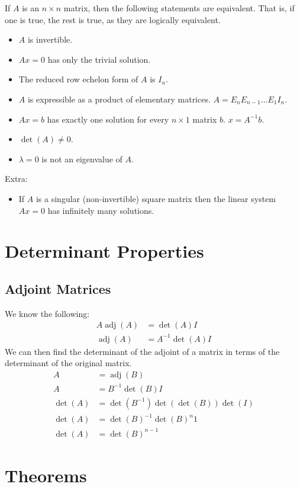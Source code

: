 \documentclass[12pt]{article}
\DeclareMathOperator{\adj}{adj}
\begin{document}
If $A$ is an $n \times n$ matrix, then the following statements are equivalent. That is, if one is true, the rest is true, as they are logically equivalent.
\begin{itemize}
    \item $A$ is invertible.
    \item $Ax = 0$ has only the trivial solution.
    \item The reduced row echelon form of $A$ is $I_n$.
    \item $A$ is expressible as a product of elementary matrices. $A = E_nE_{n-1}\dots E_1I_n$.
    \item $Ax = b$ has exactly one solution for every $n \times 1$ matrix $b$. $x = A^{-1}b$.
    \item $\det(A) \neq 0$.
    \item $\lambda = 0$ is not an eigenvalue of $A$.
\end{itemize}
Extra:
\begin{itemize}
    \item If $A$ is a singular (non-invertible) square matrix then the linear system $Ax = 0$ has infinitely many solutions.
\end{itemize}


\section{Determinant Properties}


\subsection{Adjoint Matrices}

We know the following:
\begin{align*}
    A\adj(A) &= \det(A)I\\
    \adj(A) &= A^{-1}\det(A)I
\end{align*}
We can then find the determinant of the adjoint of a matrix in terms of the determinant of the original matrix.
\begin{align*}
    A &= \adj(B)\\
    A &= B^{-1}\det(B)I\\
    \det(A) &= \det(B^{-1}) \det(\det(B)) \det(I)\\
    \det(A) &= \det(B)^{-1} \det(B)^n 1\\
    \det(A) &= \det(B)^{n-1}
\end{align*}


\section{Theorems}
\end{document}
